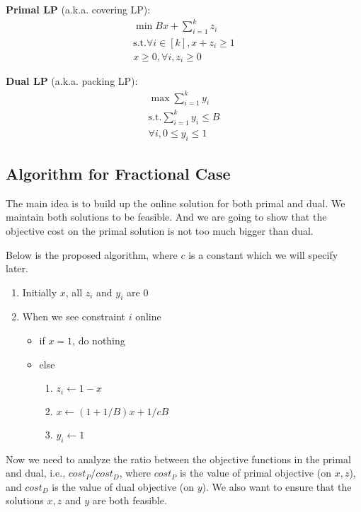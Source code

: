 \documentclass[11pt]{article}
\begin{document}
\textbf{Primal LP} (a.k.a. covering LP): 
\begin{equation}
\begin{split}
\min Bx+\sum_{i=1}^{k}{z_i} \\
\text{s.t.} \forall i\in [k], x+z_i \ge 1 \\
     x\ge 0, \forall i, z_i \ge 0
\end{split}
\end{equation}

\textbf{Dual LP} (a.k.a. packing LP):
\begin{equation}
\begin{split}
\max \sum_{i=1}^{k}{y_i} \\
\text{s.t.} \sum_{i=1}^{k}{y_i} \le B\\
     \forall i, 0 \le y_i \le 1
\end{split}
\end{equation}

\subsection{Algorithm for Fractional Case}

The main idea is to build up the online solution for both primal and dual. We maintain both solutions to be feasible. And we are going to show that the objective cost on the primal solution is not too much bigger than dual. 


Below is the proposed algorithm, where $c$ is a constant which we will specify later. 

\begin{enumerate}
\item Initially $x$, all $z_i$ and $y_i$ are $0$
\item When we see constraint $i$ online 
\begin{itemize}
\item if $x=1$, do nothing
\item else
\begin{enumerate}
\item $z_i \gets 1-x$
\item $x \gets (1+1/B)x+1/cB$
\item $y_i \gets 1$
\end{enumerate}
\end{itemize}
\end{enumerate}

Now we need to analyze the ratio between the objective functions in the primal and dual, i.e., $cost_P/cost_D$, where $cost_P$ is the value of primal objective (on $x,z$), and $cost_D$ is the value of dual objective (on $y$). We also want to ensure that the solutions $x,z$ and $y$ are both feasible. 
\end{document}
